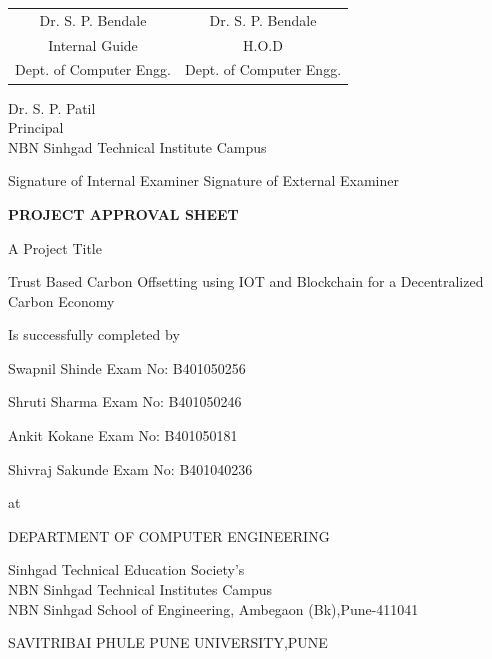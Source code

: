 \documentclass[oneside,a4paper,12pt]{book}
\renewcommand{\arraystretch}{1.4}
\begin{document}
\bgroup
\def\arraystretch{0.7}
\vspace*{1\baselineskip}
\begin{tabular}{c c }
Dr. S. P. Bendale &  \hspace{50 mm} Dr. S. P. Bendale \\								
Internal Guide   &  \hspace{50 mm} H.O.D \\
Dept. of Computer Engg.  &	\hspace{50 mm}Dept. of Computer Engg.  \\
\end{tabular}
\vspace*{1\baselineskip} 
\begin{center}
{
Dr. S. P. Patil \\
Principal\\
NBN Sinhgad Technical Institute Campus   
}
\end{center}
\vspace*{1.5\baselineskip}
Signature of Internal Examiner \hspace{30 mm} Signature of External Examiner
\newpage
\begin{center}
\textbf{PROJECT APPROVAL SHEET}
\end{center}
\begin{center}
 A Project Title
 \end{center} 
\begin{center}
Trust Based Carbon Offsetting using IOT and Blockchain for a Decentralized Carbon Economy
\end{center}
\begin{center}
Is successfully completed by 
\end{center}
\centerline{Swapnil Shinde  \hspace{27 mm} Exam No: B401050256 } 
\centerline{Shruti Sharma \hspace{21 mm} Exam No: B401050246}
\centerline{Ankit Kokane \hspace{24 mm} Exam No: B401050181 } 
\centerline{Shivraj Sakunde \hspace{24 mm} Exam No: B401040236 } 

\begin{center}
 at
 \end{center} 
 \begin{center}
 DEPARTMENT OF COMPUTER ENGINEERING
 \end{center}
 \begin{center}
Sinhgad Technical Education Society's \\
NBN Sinhgad Technical Institutes Campus \\
NBN Sinhgad School of Engineering, Ambegaon (Bk),Pune-411041\\
 \end{center}
 \begin{center}
 SAVITRIBAI PHULE PUNE UNIVERSITY,PUNE
 \end{center}
 
\end{document}

